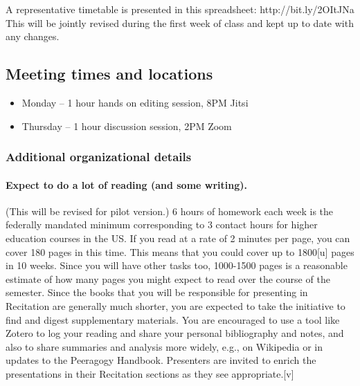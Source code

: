A representative timetable is presented in this spreadsheet:
http://bit.ly/2OItJNa This will be jointly revised during the first week
of class and kept up to date with any changes.

\hypertarget{meeting-times-and-locations}{%
\subsection{Meeting times and
locations}\label{meeting-times-and-locations}}

\begin{itemize}
\tightlist
\item
  Monday -- 1 hour hands on editing session, 8PM Jitsi
\item
  Thursday -- 1 hour discussion session, 2PM Zoom
\end{itemize}

\hypertarget{additional-organizational-details}{%
\subsubsection{Additional organizational
details}\label{additional-organizational-details}}

\hypertarget{expect-to-do-a-lot-of-reading-and-some-writing.}{%
\paragraph{Expect to do a lot of reading (and some
writing).}\label{expect-to-do-a-lot-of-reading-and-some-writing.}}

(This will be revised for pilot version.) 6 hours of homework each week
is the federally mandated minimum corresponding to 3 contact hours for
higher education courses in the US. If you read at a rate of 2 minutes
per page, you can cover 180 pages in this time. This means that you
could cover up to 1800{[}u{]} pages in 10 weeks. Since you will have
other tasks too, 1000-1500 pages is a reasonable estimate of how many
pages you might expect to read over the course of the semester. Since
the books that you will be responsible for presenting in Recitation are
generally much shorter, you are expected to take the initiative to find
and digest supplementary materials. You are encouraged to use a tool
like Zotero to log your reading and share your personal bibliography and
notes, and also to share summaries and analysis more widely, e.g., on
Wikipedia or in updates to the Peeragogy Handbook. Presenters are
invited to enrich the presentations in their Recitation sections as they
see appropriate.{[}v{]}

